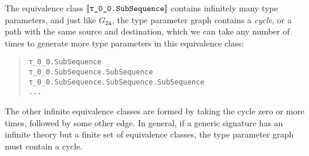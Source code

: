 \documentclass[../generics]{subfiles}
\begin{document}
\begin{example}
\begin{center}
\begin{tikzpicture}[x=3.2cm,y=1.3cm]
\end{tikzpicture}
\end{center}
The equivalence class $\archetype{\rT.SubSequence}$ contains infinitely many type parameters, and just like $G_\texttt{Z4}$, the type parameter graph contains a \emph{cycle}, or a path with the same source and destination, which we can take any number of times to generate more type parameters in this equivalence class:
\begin{quote}
\begin{verbatim}
τ_0_0.SubSequence
τ_0_0.SubSequence.SubSequence
τ_0_0.SubSequence.SubSequence.SubSequence
...
\end{verbatim}
\end{quote}
The other infinite equivalence classes are formed by taking the cycle zero or more times, followed by some other edge. In general, if a generic signature has an infinite theory but a finite set of equivalence classes, the type parameter graph must contain a cycle.
\end{example}
\end{document}
